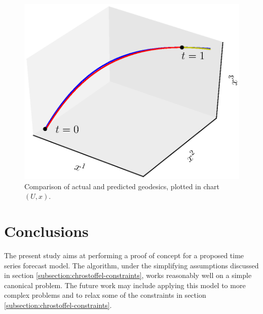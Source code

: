 \documentclass[a4paper,11pt]{elsarticle}
\begin{document}
\begin{figure}[!h]
  \centering
  \includegraphics[scale=0.6, bb=0 0 460 345, trim={1cm 1cm 1cm 1.5cm},clip]{geodesic-result.eps}
  \caption{Comparison of actual and predicted geodesics, plotted in
    chart $(U, x)$.}
  \label{fig:result-geodesic}
\end{figure}

\section{Conclusions}\label{section:conclusions}

The present study aims at performing a proof of concept for a proposed
time series forecast model. The algorithm, under the simplifying
assumptions discussed in section
\ref{subsection:chrostoffel-constraints}, works reasonably well on a
simple canonical problem. The future work may include applying this
model to more complex problems and to relax some of the constraints in
section \ref{subsection:chrostoffel-constraints}.



\end{document}

